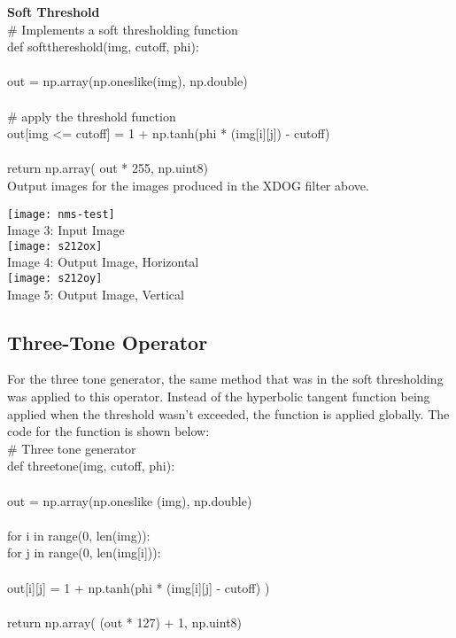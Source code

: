\documentclass{article}
\begin{document}
	\smallskip
	
	\textbf{Soft Threshold}\\
	
	\noindent \# Implements a soft thresholding function\\
	def soft\textunderscore thereshold(img, cutoff, phi):\\
	\\
	\indent out = np.array(np.ones\textunderscore like(img), np.double)\\
	\\
	\indent \# apply the threshold function\\
	\indent out[img <= cutoff] = 1 + np.tanh(phi * (img[i][j]) - cutoff)\\
	\\
	\indent return np.array( out * 255, np.uint8)\\
	
	Output images for the images produced in the XDOG filter above.\\
	
	\begin{center}
		\noindent \texttt{[image: nms-test]}\\
		Image 3: Input Image\\
		
		\texttt{[image: s212ox]}\\
		Image 4: Output Image, Horizontal\\
		
		\texttt{[image: s212oy]}\\
		Image 5: Output Image, Vertical\\
	\end{center}
	
	\subsection{Three-Tone Operator}
	
	For the three tone generator, the same method that was in the soft thresholding was applied to this operator. Instead of the hyperbolic tangent function being applied when the threshold wasn't exceeded, the function is applied globally. The code for the function is shown below:\\
	
	\noindent \# Three tone generator\\
	\noindent def three\textunderscore tone(img, cutoff, phi):\\
	\\
	\indent out = np.array(np.ones\textunderscore like (img), np.double)\\
	\\
	\indent for i in range(0, len(img)):\\
	\indent \indent for j in range(0, len(img[i])):\\
	\\
	\indent \indent \indent out[i][j] = 1 + np.tanh(phi * (img[i][j] - cutoff) )\\
	\\
	\indent return np.array( (out * 127) + 1, np.uint8)\\
	
\end{document}
